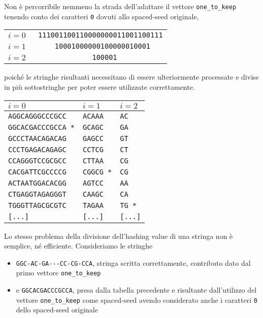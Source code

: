 \begin{example}
	Non è percorribile nemmeno la strada dell'adattare il vettore \verb|one_to_keep| tenendo conto dei caratteri \texttt{0} dovuti allo spaced-seed originale, \begin{center}
		\begin{tabular}{l || l}
			$i = 0$ & \verb| 111001100110000000011001100111| \\
			$i = 1$ & \verb|     10001000000100000010001   | \\
			$i = 2$ & \verb|              100001           | \\
		\end{tabular}
	\end{center} poiché le stringhe risultanti necessitano di essere ulteriormente processate e divise in più sottostringhe per poter essere utilizzate correttamente.
	
	
	\begin{center}
		\begin{tabular}{l | l | l}
			$i = 0$ & $i = 1$ & $i = 2$ \\
			\toprule
			\verb|AGGCAGGGCCCGCC| & \verb|ACAAA| & \verb|AC| \\
			\verb|GGCACGACCCGCCA *| & \verb|GCAGC| & \verb|GA| \\
			\verb|GCCCTAACAGACAG| & \verb|GAGCC| & \verb|GT| \\
			\verb|CCCTGAGACAGAGC| & \verb|CCTCG| & \verb|CT| \\
			\verb|CCAGGGTCCGCGCC| & \verb|CTTAA| & \verb|CG| \\
			\verb|CACGATTCGCCCCG| & \verb|CGGCG *| & \verb|CG| \\
			\verb|ACTAATGGACACGG| & \verb|AGTCC| & \verb|AA| \\
			\verb|CTGAGGTAGAGGGT| & \verb|CAAGC| & \verb|CA| \\
			\verb|TGGGTTAGCGCGTC| & \verb|TAGAA| & \verb|TG *| \\
			\verb|[...]| & \verb|[...]| & \verb|[...]| \\
		\end{tabular}
	\end{center}

	Lo stesso problema della divisione dell'hashing value di una stringa non è semplice, né efficiente. Consideriamo le stringhe \begin{itemize}
		\item \verb|GGC-AC-GA---CC-CG-CCA|, stringa scritta correttamente, contributo dato dal primo vettore \verb|one_to_keep|
		\item e \verb|GGCACGACCCGCCA|, presa dalla tabella precedente e risultante dall'utilizzo del vettore \verb|one_to_keep| come spaced-seed avendo considerato anche i caratteri \texttt{0} dello spaced-seed originale
	\end{itemize}
	

\end{example}
